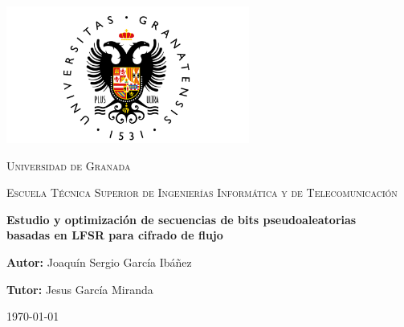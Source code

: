 \documentclass[12pt,a4paper]{report}
\begin{document}

\begin{titlepage}
    \centering
    \vspace*{1cm}
    \includegraphics[width=8cm]{figures/UGR-Logo.png}\par\vspace{0.5cm}

    {\scshape\LARGE Universidad de Granada \par}
    {\scshape\Large Escuela Técnica Superior de Ingenierías Informática y de Telecomunicación \par}
    \vspace{1.2cm}

    {\bfseries\Huge
    Estudio y optimización de secuencias de bits pseudoaleatorias\\
    basadas en LFSR para cifrado de flujo \par}
    \vspace{1.5cm}

    {\Large \textbf{Autor:} Joaquín Sergio García Ibáñez \par}
    \vspace{0.4cm}
    {\Large \textbf{Tutor:} Jesus García Miranda \par}

    \vfill
    {\large \today\par}
\end{titlepage}

\tableofcontents
\cleardoublepage
{}







\printbibliography
\end{document}
